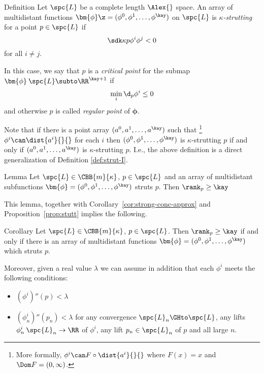 \begin{thm}{Definition}\label{def:strut-II}
Let $\spc{L}$ be a complete length $\Alex{}$ space.
An array of multidistant functions 
$\bm{\phi}\z=(\phi^0,\phi^1,\dots,\phi^\kay)$
on $\spc{L}$
is \emph{$\kappa$-strutting} for a point $p\in\spc{L}$ if 
\[\sdk\kappa{p}{\phi^i}{\phi^j}<0\]
for all $i\not=j$.

In this case, we say that $p$ is a 
\emph{critical point} 
for the submap $\bm{\phi}\:\spc{L}\subto \RR^{\kay+1}$
if
\[\min_i\d_p\phi^i\le 0\]
and otherwise $p$ is called 
\emph{regular point} of $\bm{\phi}$.
\end{thm} 

Note that if there is a point array $(a^0,a^1,\dots,a^\kay)$
such that%
\footnote{More formally, $\phi^i\can F\circ\dist{a^i}{}{}$ where $F(x)=x$ and $\Dom F=(0,\infty)$.} $\phi^i\can\dist{a^i}{}{}$ for each $i$
then $(\phi^0,\phi^1,\dots,\phi^\kay)$
is $\kappa$-strutting $p$
if and only if 
$(a^0,a^1,\dots,a^\kay)$ is $\kappa$-strutting $p$.
I.e., the above definition is a direct generalization of Definition \ref{def:strut-I}.

\begin{thm}{Lemma}\label{lem:multi+rank}
Let $\spc{L}\in\CBB{m}{\kappa}$, 
$p\in  \spc{L}$
and an array of multidistant subfunctions $\bm{\phi}=(\phi^0,\phi^1,\dots,\phi^\kay)$ struts $p$.
Then $\rank_p\ge \kay$
\end{thm}

This lemma, 
together with Corollary~\ref{cor:strong-conc-approx}
and Proposition~\ref{prop:stutt} implies the following.


\begin{thm}{Corollary}\label{cor:multi+rank}
Let $\spc{L}\in\CBB{m}{\kappa}$, 
$p\in  \spc{L}$.
Then $\rank_p\ge \kay$
if and only if there is an array of multidistant functions $\bm{\phi}=(\phi^0,\phi^1,\dots,\phi^\kay)$ which struts $p$.

Moreover, given a real value $\lambda$
we can assume in addition that each $\phi^i$ meets the following conditions:
\begin{itemize}
\item $(\phi^i)''(p)< \lambda$
\item $(\phi_n^i)''(p_n)< \lambda$ for 
any convergence $\spc{L}_n\GHto\spc{L}$,
any lifts $\phi^i_n\:\spc{L}_n\to\RR$ of $\phi^i$,
any lift $p_n\in \spc{L}_n$ of $p$
and all large $n$.
\end{itemize}
\end{thm}

